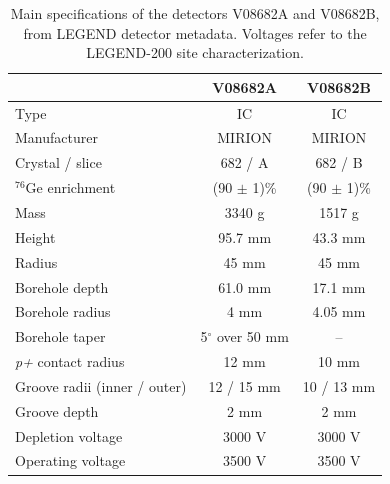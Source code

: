 \begin{table}[H]
    \centering
    \begin{tabular}{lcc}
        \toprule
        & \textbf{V08682A} & \textbf{V08682B} \\
        \midrule
        Type                              & IC                  & IC                  \\
        Manufacturer                      & MIRION              & MIRION              \\
        Crystal / slice                   & 682 / A             & 682 / B             \\
        ${}^{76}$Ge enrichment            & (90 $\pm$ 1)\%      & (90 $\pm$ 1)\%      \\
        Mass                              & 3340 g              & 1517 g              \\
        \midrule
        Height                            & 95.7 mm             & 43.3 mm             \\
        Radius                            & 45 mm               & 45 mm               \\
        Borehole depth                    & 61.0 mm             & 17.1 mm             \\
        Borehole radius                   & 4 mm                & 4.05 mm             \\
        Borehole taper                    & 5$^\circ$ over 50 mm & --                 \\
        \textit{p+} contact radius        & 12 mm               & 10 mm               \\
        Groove radii (inner / outer)      & 12 / 15 mm          & 10 / 13 mm          \\
        Groove depth                      & 2 mm                & 2 mm                \\
        \midrule
        Depletion voltage                 & 3000 V              & 3000 V              \\
        Operating voltage                 & 3500 V              & 3500 V              \\
        \bottomrule
    \end{tabular}
    \caption{Main specifications of the detectors V08682A and V08682B, from LEGEND detector metadata. Voltages refer to the LEGEND-200 site characterization.}
    \label{tab:V08682AB}
\end{table}

